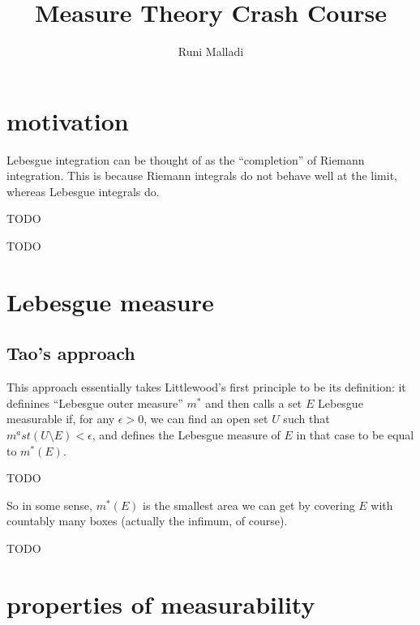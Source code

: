 \documentclass[12pt]{article}
\title{Measure Theory Crash Course}
\author{Runi Malladi}
\begin{document}
\maketitle

\section{motivation} %

Lebesgue integration can be thought of as the ``completion'' of Riemann integration. This is because
Riemann integrals do not behave well at the limit, whereas Lebesgue integrals do. 

\begin{example}
	TODO
\end{example}

\begin{example}
	TODO
\end{example}


\section{Lebesgue measure} 

\subsection{Tao's approach}

This approach essentially takes Littlewood's first principle to be its definition: it definines 
``Lebesgue outer measure'' $m^\ast$ and then calls a set $E$ Lebesgue measurable if, for any 
$\epsilon>0$, we can find an open set $U$ such that $m^ast(U\setminus E) < \epsilon$, and defines 
the Lebesgue measure of $E$ in that case to be equal to $m^\ast(E)$. 

\begin{definition}
	TODO
\end{definition}

So in some sense, $m^\ast(E)$ is the smallest area we can get by covering $E$ with countably many boxes
(actually the infimum, of course).

\begin{definition}
	TODO
\end{definition}

\section{properties of measurability} %
\end{document}
